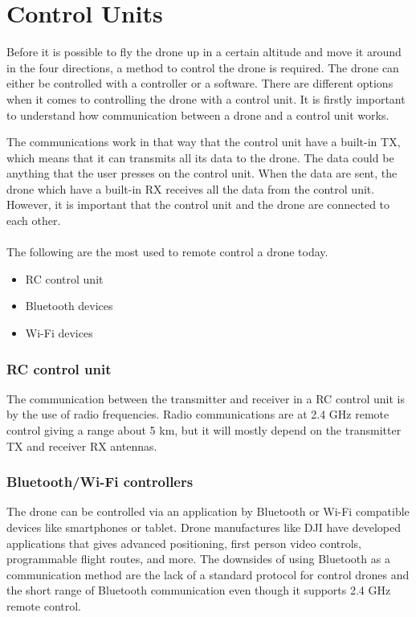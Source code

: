 \section{Control Units}\label{s:cont}
Before it is possible to fly the drone up in a certain altitude and move it around in the four directions, a method to control the drone is required. The drone can either be controlled with a controller or a software. %
\newline
There are different options when it comes to controlling the drone with a control unit. It is firstly important to understand how communication between a drone and a control unit works. %

The communications work in that way that the control unit have a built-in TX, which means that it can transmits all its data to the drone. The data could be anything that the user presses on the control unit. When the data are sent, the drone which have a built-in RX receives all the data from the control unit. However, it is important that the control unit and the drone are connected to each other. \cite{Control}
\\ \\
The following are the most used to remote control a drone today. 

 \begin{itemize}
        \item RC control unit
        \item Bluetooth devices
        \item Wi-Fi devices
\end{itemize}
\subsubsection*{RC control unit}
The communication between the transmitter and receiver in a RC control unit is by the use of radio frequencies. Radio communications are at 2.4 GHz remote control giving a range about 5 km, but it will mostly depend on the transmitter TX and receiver RX antennas. \cite{droneRange}

\subsubsection*{Bluetooth/Wi-Fi controllers}
The drone can be controlled via an application by Bluetooth or Wi-Fi compatible devices like smartphones or tablet. Drone manufactures like DJI have developed applications that gives advanced positioning, first person video controls, programmable flight routes, and more. The downsides of using Bluetooth as a communication method are the lack of a standard protocol for control drones and the short range of Bluetooth communication even though it supports 2.4 GHz remote control.\cite{droneRange} \\

